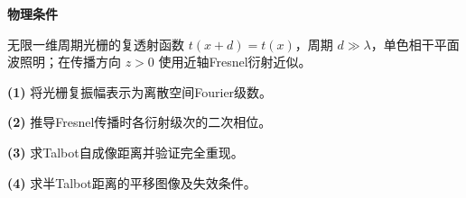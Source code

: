 \textbf{物理条件}\par 无限一维周期光栅的复透射函数 \(t(x+d)=t(x)\)，周期 \(d\gg\lambda\)，单色相干平面波照明；在传播方向 \(z>0\) 使用近轴Fresnel衍射近似。
\par\noindent\textbf{(1)} 将光栅复振幅表示为离散空间Fourier级数。
\par\noindent\textbf{(2)} 推导Fresnel传播时各衍射级次的二次相位。
\par\noindent\textbf{(3)} 求Talbot自成像距离并验证完全重现。
\par\noindent\textbf{(4)} 求半Talbot距离的平移图像及失效条件。
